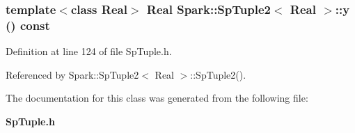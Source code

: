\subsubsection{\setlength{\rightskip}{0pt plus 5cm}template$<$class Real$>$ Real {\bf Spark::Sp\-Tuple2}$<$ Real $>$::y () const\hspace{0.3cm}{\tt  [inline]}}\label{classSpark_1_1SpTuple2_a4}


Definition at line 124 of file Sp\-Tuple.h.

Referenced by Spark::Sp\-Tuple2$<$ Real $>$::Sp\-Tuple2().

The documentation for this class was generated from the following file:\begin{CompactItemize}
\item 
{\bf Sp\-Tuple.h}\end{CompactItemize}
